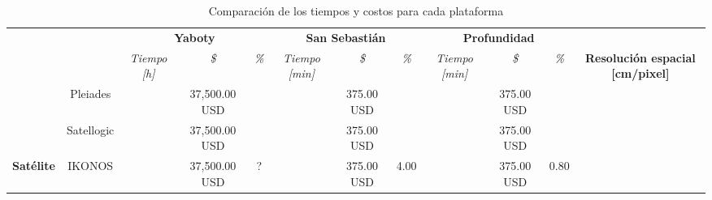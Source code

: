 \begin{landscape}
\begin{table}[]

    \caption{Comparación de los tiempos y costos para cada plataforma}
    \label{tab:tabla}
   
    \begin{tabular}{cc|ccc|ccc|ccc|c|}
    \cline{3-12}
    \multicolumn{2}{c|}{} &
      \multicolumn{3}{c|}{\cellcolor[HTML]{68CBD0}\textbf{Yaboty}} &
      \multicolumn{3}{c|}{\cellcolor[HTML]{68CBD0}\textbf{San   Sebastián}} &
      \multicolumn{3}{c|}{\cellcolor[HTML]{68CBD0}\textbf{Profundidad}} &
       \\ \cline{3-11}
    \multicolumn{2}{c|}{\multirow{-2}{*}{}} &
      \multicolumn{1}{c|}{\cellcolor[HTML]{68CBD0}\textit{Tiempo {[}h{]}}} &
      \multicolumn{1}{c|}{\cellcolor[HTML]{68CBD0}\textit{\$}} &
      \cellcolor[HTML]{68CBD0}\textit{\%} &
      \multicolumn{1}{c|}{\cellcolor[HTML]{68CBD0}\textit{Tiempo {[}min{]}}} &
      \multicolumn{1}{c|}{\cellcolor[HTML]{68CBD0}\textit{\$}} &
      \cellcolor[HTML]{68CBD0}\textit{\%} &
      \multicolumn{1}{c|}{\cellcolor[HTML]{68CBD0}\textit{Tiempo {[}min{]}}} &
      \multicolumn{1}{c|}{\cellcolor[HTML]{68CBD0}\textit{\$}} &
      \cellcolor[HTML]{68CBD0}\textit{\%} &
      \multirow{-2}{*}{\textbf{Resolución espacial {[}cm/pixel{]}}} \\ \hline
    \multicolumn{1}{|c|}{\cellcolor[HTML]{9698ED}} &
      \cellcolor[HTML]{9698ED}Pleiades &
      \multicolumn{1}{c|}{} &
      \multicolumn{1}{c|}{37,500.00 USD} &
       &
      \multicolumn{1}{c|}{} &
      \multicolumn{1}{c|}{375.00 USD} &
       &
      \multicolumn{1}{c|}{} &
      \multicolumn{1}{c|}{375.00 USD} &
       &
       \\ \cline{2-12} 
    \multicolumn{1}{|c|}{\cellcolor[HTML]{9698ED}} &
      \cellcolor[HTML]{9698ED}Satellogic &
      \multicolumn{1}{c|}{} &
      \multicolumn{1}{c|}{37,500.00 USD} &
       &
      \multicolumn{1}{c|}{} &
      \multicolumn{1}{c|}{375.00 USD} &
       &
      \multicolumn{1}{c|}{} &
      \multicolumn{1}{c|}{375.00 USD} &
       &
       \\ \cline{2-12} 
    \multicolumn{1}{|c|}{\multirow{-3}{*}{\cellcolor[HTML]{9698ED}\textbf{Satélite}}} &
      \cellcolor[HTML]{9698ED}IKONOS &
      \multicolumn{1}{c|}{} &
      \multicolumn{1}{c|}{37,500.00 USD} &
      ? &
      \multicolumn{1}{c|}{} &
      \multicolumn{1}{c|}{375.00 USD} &
      4.00 &
      \multicolumn{1}{c|}{} &
      \multicolumn{1}{c|}{375.00 USD} &
      0.80 &

\end{tabular}
\end{table}
\end{landscape}
